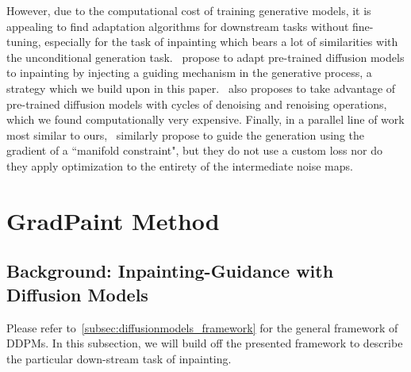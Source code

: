 However, due to the computational cost of training generative models, it is appealing 
to find adaptation algorithms for downstream tasks without fine-tuning, especially for
 the task of inpainting which bears a lot of similarities with the unconditional 
 generation task.~\cite{rombach2022high, nichol2021glide, song2021scorebased} propose to adapt
  pre-trained diffusion models to inpainting by injecting a guiding mechanism in the 
  generative process, a strategy which we build upon in this paper.~\cite{lugmayr2022repaint} also
   proposes to take advantage of pre-trained diffusion models with cycles of denoising 
   and renoising operations, which we found computationally very expensive. Finally, 
   in a parallel line of work most similar to ours,~\cite{mcg} similarly propose to
    guide the generation using the gradient of a ``manifold constraint", but they do 
    not use a custom loss nor do they apply optimization to the entirety of the 
    intermediate noise maps.



\section{GradPaint Method}



\subsection{Background: Inpainting-Guidance with Diffusion Models}\label{background}

Please refer to~\ref{subsec:diffusionmodels_framework} for the general framework of \ac{DDPM}s. 
In this subsection, we will build off the presented framework to describe the particular down-stream task of inpainting. 



